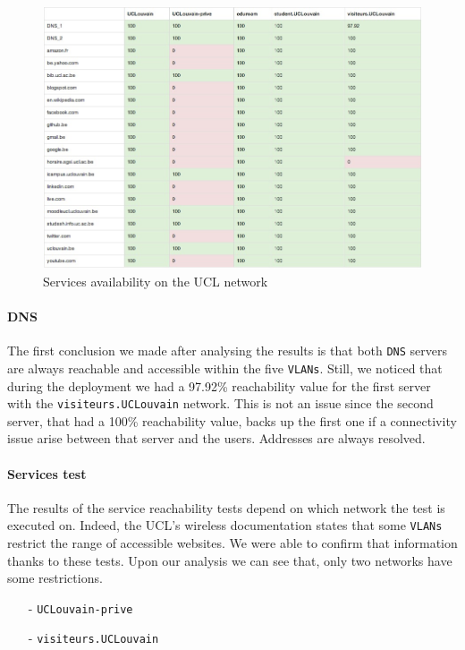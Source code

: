 \begin{figure}[H]
	\centering
   \includegraphics[width=1\textwidth]{Pictures/chapter6/services.jpg}
   \caption{Services availability on the UCL network}
\end{figure} 


\paragraph*{DNS} The first conclusion we made after analysing the results is that both \texttt{DNS} servers are always reachable and accessible within the five \texttt{VLANs}. Still, we noticed that during the deployment we had a 97.92\% reachability value for the first server with the \texttt{visiteurs.UCLouvain} network. This is not an issue since the second server, that had a 100\% reachability value, backs up the first one if a connectivity issue arise between that server and the users. Addresses are always resolved.

\paragraph*{Services test} The results of the service reachability tests depend on which network the test is executed on. Indeed, the UCL's wireless documentation states that some \texttt{VLANs} restrict the range of accessible websites. We were able to confirm that information thanks to these tests. Upon our analysis we can see that, only two networks have some restrictions.

\begin{itemize}
	\item [-] \texttt{UCLouvain-prive}
	\item [-] \texttt{visiteurs.UCLouvain}
\end{itemize}

